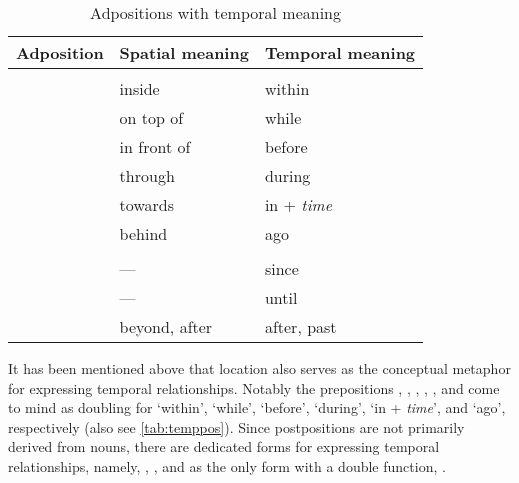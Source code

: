 \begin{table}[tp]\centering
\caption{Adpositions with temporal meaning}
\begin{tabu} to \linewidth {X X X}
\tableheaderfont\toprule
Adposition
	& Spatial meaning
	& Temporal meaning
	\\

\toprule

\tablesubheaderfont{} \\

\midrule

	& inside
	& within
	\\

	& on top of
	& while
	\\

	& in front of
	& before
	\\

	& through
	& during
	\\

	& towards
	& in + \textit{time}
	\\

	& behind
	& ago
	\\

\midrule

\tablesubheaderfont{} \\

\midrule

	& ---
	& since
	\\

	& ---
	& until
	\\

	& beyond, after
	& after, past
	\\

\bottomrule
\end{tabu}

\label{tab:temppos}
\end{table}

It has been mentioned above that location also serves as the conceptual
metaphor for expressing temporal relationships. Notably the prepositions
, , , , , and
 come to mind as doubling for `within', `while',
`before', `during', `in + \emph{time}', and `ago', respectively (also see
\autoref{tab:temppos}). Since postpositions are not primarily derived from
nouns, there are dedicated forms for expressing temporal relationships, namely,
,
, and as the only form with a double function,
.

